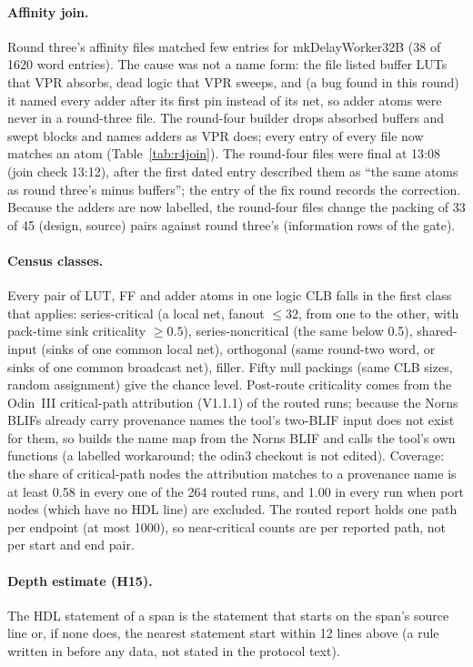 \paragraph{Affinity join.} Round three's affinity files matched few entries for mkDelayWorker32B (38 of 1620
word entries). The cause was not a name form: the file listed buffer LUTs that VPR absorbs, dead logic that VPR sweeps, and
(a bug found in this round) it named every adder after its first pin instead of its  net, so adder atoms were never in a round-three file.
The round-four builder drops absorbed buffers and swept blocks and names adders as VPR does; every entry of every file now matches an atom
(Table~\ref{tab:r4join}). The round-four files were final at 13:08 (join check 13:12), after the first dated entry described them as ``the same atoms as round three's minus buffers''; the entry of the fix round records the correction. Because the adders are now labelled, the round-four files change the packing of 33 of 45 (design, source) pairs against round three's (information rows of the gate).

\paragraph{Census classes.} Every pair of LUT, FF and adder atoms in one logic CLB falls in the first class that applies:
series-critical (a local net, fanout $\le32$, from one to the other, with pack-time sink criticality $\ge0.5$), series-noncritical (the same below 0.5),
shared-input (sinks of one common local net), orthogonal (same round-two word, or sinks of one common broadcast net),
filler. Fifty null packings (same CLB sizes, random assignment) give the chance level. Post-route criticality comes from the Odin~III
critical-path attribution (V1.1.1) of the routed runs; because the Norns BLIFs already carry provenance names the tool's
two-BLIF input does not exist for them, so  builds the name map from the Norns BLIF and calls the tool's own functions
(a labelled workaround; the odin3 checkout is not edited). Coverage: the share of critical-path nodes the attribution matches to a provenance name is at least 0.58 in every one of the 264 routed runs, and 1.00 in every run when port nodes (which have no HDL line) are excluded. The routed report holds one path per endpoint (at most 1000), so near-critical counts are per reported path, not per start and end pair.

\paragraph{Depth estimate (H15).} The HDL statement of a span is the statement that starts on the span's source line or, if none does, the nearest statement start within 12 lines above (a rule written in  before any data, not stated in the protocol text).


